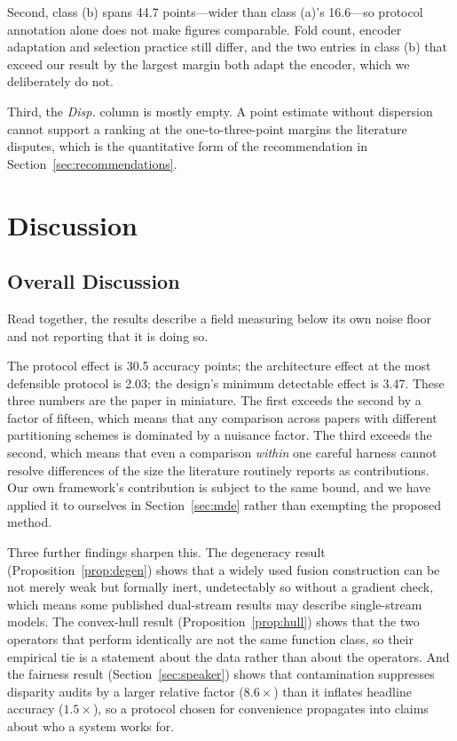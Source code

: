\documentclass[journal,onecolumn,11pt,draftclsnofoot]{IEEEtran}   %
\begin{document}
Second, class (b) spans 44.7 points---wider than class (a)'s 16.6---so protocol
annotation alone does not make figures comparable. Fold count, encoder
adaptation and selection practice still differ, and the two entries in class (b)
that exceed our result by the largest margin \cite{goel2024camulenet,
lunajimenez2022multimodal} both adapt the encoder, which we deliberately do not.

Third, the \emph{Disp.} column is mostly empty. A point estimate without
dispersion cannot support a ranking at the one-to-three-point margins the
literature disputes, which is the quantitative form of the recommendation in
Section~\ref{sec:recommendations}.

\section{Discussion}
\label{sec:discussion}

\subsection{Overall Discussion}
\label{sec:overall}
Read together, the results describe a field measuring below its own noise floor
and not reporting that it is doing so.

The protocol effect is 30.5 accuracy points; the architecture effect at the most
defensible protocol is 2.03; the design's minimum detectable effect is 3.47.
These three numbers are the paper in miniature. The first exceeds the second by
a factor of fifteen, which means that any comparison across papers with
different partitioning schemes is dominated by a nuisance factor. The third
exceeds the second, which means that even a comparison \emph{within} one careful
harness cannot resolve differences of the size the literature routinely reports
as contributions. Our own framework's contribution is subject to the same bound,
and we have applied it to ourselves in Section~\ref{sec:mde} rather than
exempting the proposed method.

Three further findings sharpen this. The degeneracy result
(Proposition~\ref{prop:degen}) shows that a widely used fusion construction can
be not merely weak but formally inert, undetectably so without a gradient check,
which means some published dual-stream results may describe single-stream
models. The convex-hull result (Proposition~\ref{prop:hull}) shows that the two
operators that perform identically are not the same function class, so their
empirical tie is a statement about the data rather than about the operators. And
the fairness result (Section~\ref{sec:speaker}) shows that contamination
suppresses disparity audits by a larger relative factor ($8.6\times$) than it
inflates headline accuracy ($1.5\times$), so a protocol chosen for convenience
propagates into claims about who a system works for.
\end{document}
